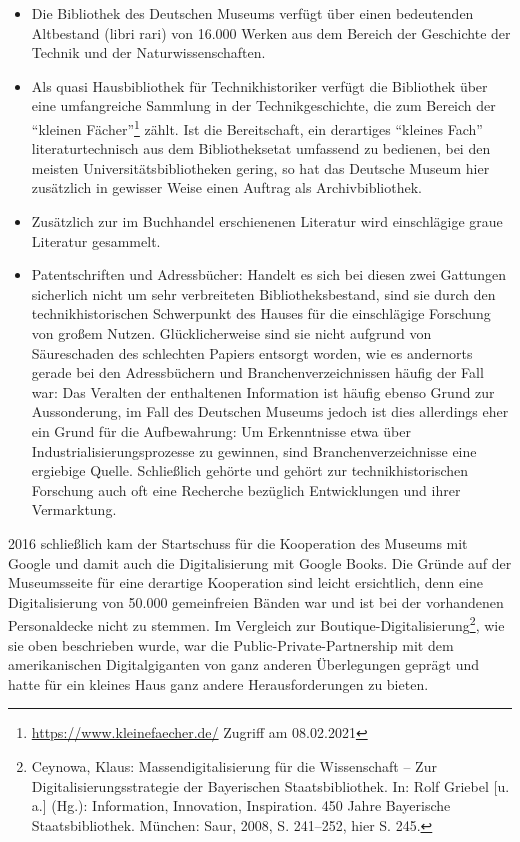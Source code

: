 \documentclass[a4paper,
fontsize=11pt,
oneside,
numbers=noperiodatend,
parskip=half-,
bibliography=totoc,
final
]{scrartcl}
\begin{document}
\begin{itemize}
\item
  Die Bibliothek des Deutschen Museums verfügt über einen bedeutenden
   Altbestand (libri rari) von 16.000 Werken aus dem
  Bereich der  Geschichte der Technik und der
  Naturwissenschaften.
\item
  Als quasi Hausbibliothek für Technikhistoriker verfügt die
   Bibliothek über eine umfangreiche Sammlung in der
   Technikgeschichte, die zum Bereich der \enquote{kleinen
  Fächer}\footnote{\url{https://www.kleinefaecher.de/} Zugriff am
    08.02.2021}  zählt. Ist die Bereitschaft, ein
  derartiges \enquote{kleines Fach}  literaturtechnisch
  aus dem Bibliotheksetat umfassend zu bedienen,  bei den
  meisten Universitätsbibliotheken gering, so hat das 
  Deutsche Museum hier zusätzlich in gewisser Weise einen Auftrag
   als Archivbibliothek.
\item
  Zusätzlich zur im Buchhandel erschienenen Literatur wird
   einschlägige graue Literatur gesammelt.
\item
  Patentschriften und Adressbücher: Handelt es sich bei diesen zwei
   Gattungen sicherlich nicht um sehr verbreiteten
   Bibliotheksbestand, sind sie durch den
  technikhistorischen  \linebreak Schwerpunkt des Hauses für die
  einschlägige Forschung von großem  Nutzen.
  Glücklicherweise sind sie nicht aufgrund von Säureschaden
   des schlechten Papiers entsorgt worden, wie es
  andernorts gerade  bei den Adressbüchern und
  Branchenverzeichnissen häufig der Fall  war: Das
  Veralten der enthaltenen Information ist häufig ebenso 
  Grund zur Aussonderung, im Fall des Deutschen Museums jedoch ist
   dies allerdings eher ein Grund für die Aufbewahrung: Um
   Erkenntnisse etwa über Industrialisierungsprozesse zu
  gewinnen,  sind Branchenverzeichnisse eine ergiebige
  Quelle. Schließlich  gehörte und gehört zur
  technikhistorischen Forschung auch oft eine  Recherche
  bezüglich Entwicklungen und ihrer Vermarktung.
\end{itemize}

2016 schließlich kam der Startschuss für die Kooperation des Museums mit
Google und damit auch die Digitalisierung mit Google Books. Die Gründe
auf der Museumsseite für eine derartige Kooperation sind leicht
ersichtlich, denn eine Digitalisierung von 50.000 gemeinfreien Bänden
war und ist bei der vorhandenen Personaldecke nicht zu stemmen. Im
Vergleich zur Boutique-Digitalisierung\footnote{Ceynowa, Klaus:
  Massendigitalisierung für die Wissenschaft -- Zur
  Digitalisierungsstrategie der Bayerischen Staatsbibliothek. In: Rolf
  Griebel {[}u.\,a.{]} (Hg.): Information, Innovation, Inspiration. 450
  Jahre Bayerische Staatsbibliothek. München: Saur, 2008, S. 241--252,
  hier S. 245.}, wie sie oben beschrieben wurde, war die
Public-Private-Partnership mit dem amerikanischen Digitalgiganten von
ganz anderen Überlegungen geprägt und hatte für ein kleines Haus ganz
andere Herausforderungen zu bieten.
\end{document}
